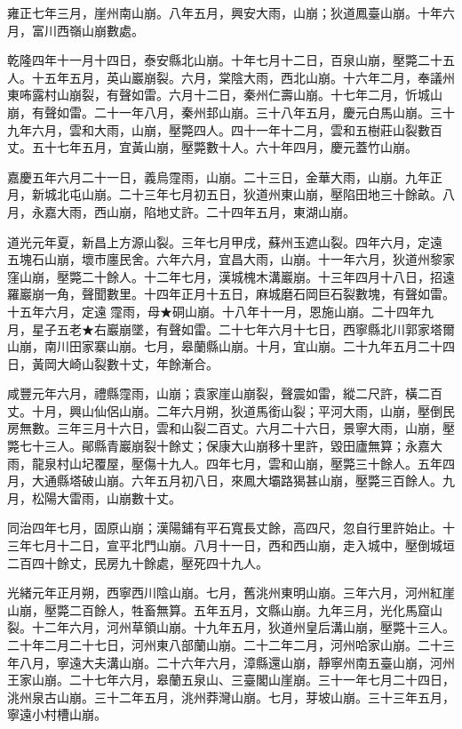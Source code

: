 \begin{pinyinscope}
雍正七年三月，崖州南山崩。八年五月，興安大雨，山崩；狄道鳳臺山崩。十年六月，富川西嶺山崩數處。

乾隆四年十一月十四日，泰安縣北山崩。十年七月十二日，百泉山崩，壓斃二十五人。十五年五月，英山巖崩裂。六月，棠陰大雨，西北山崩。十六年二月，奉議州東咘露村山崩裂，有聲如雷。六月十二日，秦州仁壽山崩。十七年二月，忻城山崩，有聲如雷。二十一年八月，秦州邽山崩。三十八年五月，慶元白馬山崩。三十九年六月，雲和大雨，山崩，壓斃四人。四十一年十二月，雲和五樹莊山裂數百丈。五十七年五月，宜黃山崩，壓斃數十人。六十年四月，慶元蓋竹山崩。

嘉慶五年六月二十一日，義烏霪雨，山崩。二十三日，金華大雨，山崩。九年正月，新城北屯山崩。二十三年七月初五日，狄道州東山崩，壓陷田地三十餘畝。八月，永嘉大雨，西山崩，陷地丈許。二十四年五月，東湖山崩。

道光元年夏，新昌上方源山裂。三年七月甲戌，蘇州玉遮山裂。四年六月，定遠五塊石山崩，壞市廛民舍。六年六月，宜昌大雨，山崩。十一年六月，狄道州黎家窪山崩，壓斃二十餘人。十二年七月，漢城槐木溝巖崩。十三年四月十八日，招遠羅巖崩一角，聲聞數里。十四年正月十五日，麻城磨石岡巨石裂數塊，有聲如雷。十五年六月，定遠霪雨，母★硐山崩。十八年十一月，恩施山崩。二十四年九月，星子五老★右巖崩墜，有聲如雷。二十七年六月十七日，西寧縣北川郭家塔爾山崩，南川田家寨山崩。七月，皋蘭縣山崩。十月，宜山崩。二十九年五月二十四日，黃岡大崎山裂數十丈，年餘漸合。

咸豐元年六月，禮縣霪雨，山崩；袁家崖山崩裂，聲震如雷，縱二尺許，橫二百丈。十月，興山仙侶山崩。二年六月朔，狄道馬銜山裂；平河大雨，山崩，壓倒民房無數。三年三月十六日，雲和山裂二百丈。六月二十六日，景寧大雨，山崩，壓斃七十三人。鄖縣青巖崩裂十餘丈；保康大山崩移十里許，毀田廬無算；永嘉大雨，龍泉村山圮覆屋，壓傷十九人。四年七月，雲和山崩，壓斃三十餘人。五年四月，大通縣塔破山崩。六年五月初八日，來鳳大壩路猲甚山崩，壓斃三百餘人。九月，松陽大雷雨，山崩數十丈。

同治四年七月，固原山崩；漢陽鋪有平石寬長丈餘，高四尺，忽自行里許始止。十三年七月十二日，宣平北門山崩。八月十一日，西和西山崩，走入城中，壓倒城垣二百四十餘丈，民房九十餘處，壓死四十九人。

光緒元年正月朔，西寧西川陰山崩。七月，舊洮州東明山崩。三年六月，河州紅崖山崩，壓斃二百餘人，牲畜無算。五年五月，文縣山崩。九年三月，光化馬窟山裂。十二年六月，河州草領山崩。十九年五月，狄道州皇后溝山崩，壓斃十三人。二十年二月二十七日，河州東八部蘭山崩。二十二年二月，河州哈家山崩。二十三年八月，寧遠大夫溝山崩。二十六年六月，漳縣還山崩，靜寧州南五臺山崩，河州王家山崩。二十七年六月，皋蘭五泉山、三臺閣山崖崩。三十一年七月二十四日，洮州泉古山崩。三十二年五月，洮州莽灣山崩。七月，芽坡山崩。三十三年五月，寧遠小村槽山崩。


\end{pinyinscope}
